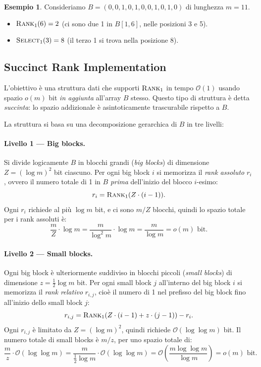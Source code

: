 \documentclass[12pt, a4paper, oneside]{book}
\theoremstyle{plain}
\theoremstyle{definition}
\newtheorem{esempio}[teorema]{Esempio}
\theoremstyle{remark}
\newcommand{\OO}[1]{\mathcal{O}\!\left(#1\right)}
\begin{document}
\begin{esempio}
Consideriamo $B = (0, 0, 1, 0, 1, 0, 0, 1, 0, 1, 0)$ di lunghezza $m = 11$.
\begin{itemize}
  \item $\textsc{Rank}_1(6) = 2$ (ci sono due 1 in $B[1,6]$, nelle posizioni 3 e 5).
  \item $\textsc{Select}_1(3) = 8$ (il terzo 1 si trova nella posizione 8).
\end{itemize}
\end{esempio}

\subsection{Succinct Rank Implementation}
\label{subsec:rank-impl}

L'obiettivo è una struttura dati che supporti $\textsc{Rank}_1$ in tempo $\OO{1}$ usando spazio $o(m)$ bit \emph{in aggiunta} all'array $B$ stesso. Questo tipo di struttura è detta \emph{succinta}: lo spazio addizionale è asintoticamente trascurabile rispetto a $B$.

La struttura si basa su una decomposizione gerarchica di $B$ in tre livelli:

\paragraph{Livello 1 — Big blocks.} Si divide logicamente $B$ in blocchi grandi (\emph{big blocks}) di dimensione $Z = (\log m)^2$ bit ciascuno. Per ogni big block $i$ si memorizza il \emph{rank assoluto} $r_i$, ovvero il numero totale di 1 in $B$ \emph{prima} dell'inizio del blocco $i$-esimo:
\[
  r_i = \textsc{Rank}_1(Z \cdot (i-1)).
\]
Ogni $r_i$ richiede al più $\log m$ bit, e ci sono $m/Z$ blocchi, quindi lo spazio totale per i rank assoluti è:
\[
  \frac{m}{Z} \cdot \log m = \frac{m}{\log^2 m} \cdot \log m = \frac{m}{\log m} = o(m) \text{ bit.}
\]

\paragraph{Livello 2 — Small blocks.} Ogni big block è ulteriormente suddiviso in blocchi piccoli (\emph{small blocks}) di dimensione $z = \frac{1}{2} \log m$ bit. Per ogni small block $j$ all'interno del big block $i$ si memorizza il \emph{rank relativo} $r_{i,j}$, cioè il numero di 1 nel prefisso del big block fino all'inizio dello small block $j$:
\[
  r_{i,j} = \textsc{Rank}_1(Z \cdot (i-1) + z \cdot (j-1)) - r_i.
\]
Ogni $r_{i,j}$ è limitato da $Z = (\log m)^2$, quindi richiede $\OO{\log \log m}$ bit. Il numero totale di small blocks è $m/z$, per uno spazio totale di:
\[
  \frac{m}{z} \cdot \OO{\log \log m} = \frac{m}{\frac{1}{2}\log m} \cdot \OO{\log \log m} = \OO{\frac{m \log \log m}{\log m}} = o(m) \text{ bit.}
\]
\end{document}
